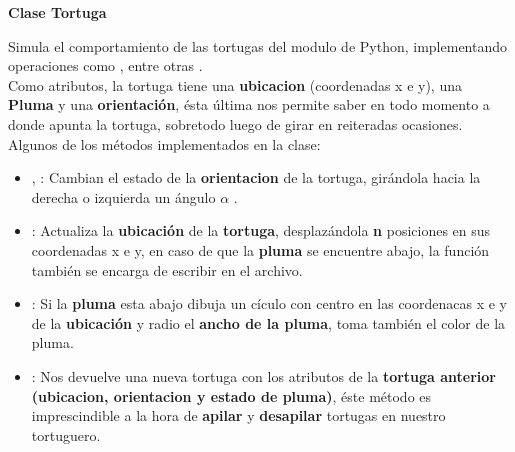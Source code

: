 \documentclass{article}
\begin{document}
	 \begin{huge}
		\textbf{Clase Tortuga}\\[0.4cm]
	\end{huge}
	Simula el comportamiento de las  tortugas del modulo  de Python, implementando operaciones como  ,  entre otras .\\[0.5cm]
	Como atributos, la tortuga tiene una \textbf{ubicacion} (coordenadas x e y), una \textbf{Pluma} y una \textbf{orientaci\'on}, \'esta \'ultima nos permite saber en todo momento a donde apunta la tortuga, sobretodo luego de girar en reiteradas ocasiones.\\[0.3cm]
 	Algunos de los m\'etodos implementados en la clase:\\
	\begin{itemize}
		\item {}, : Cambian el estado de la  \textbf{orientacion} de la tortuga, gir\'andola hacia la derecha o izquierda un \'angulo $\alpha$ . \\
		\item {} : Actualiza la \textbf{ubicaci\'on} de la \textbf{tortuga}, desplaz\'andola \textbf{n} posiciones en sus coordenadas x e y, en caso de que la \textbf{pluma} se encuentre abajo, la funci\'on tambi\'en se encarga de escribir en el archivo. \\
		\item {} : Si la \textbf{pluma} esta abajo dibuja un c\'iculo con centro en las coordenacas x e y de la \textbf{ubicaci\'on} y radio el \textbf{ancho de la pluma},  toma tambi\'en el color de la pluma.\\
		\item {} : Nos devuelve una nueva tortuga con los atributos de la \textbf{tortuga anterior (ubicacion, orientacion y estado de pluma)}, \'este m\'etodo es imprescindible a la hora de \textbf{apilar} y \textbf{desapilar} tortugas en nuestro tortuguero.


	\end{itemize}

\newpage

\end{document}
